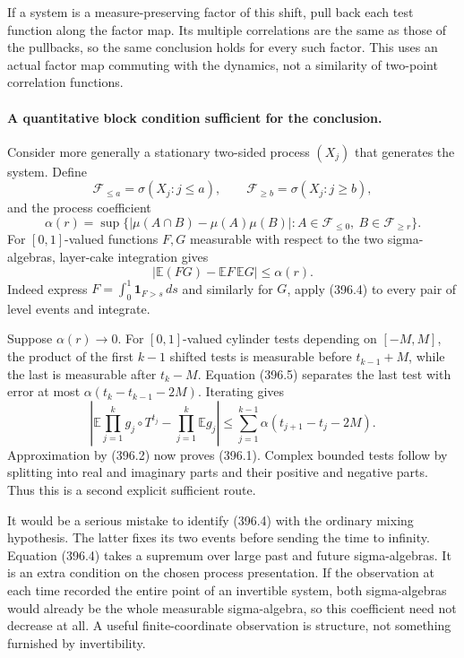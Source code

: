 \documentclass[11pt]{article}
\begin{document}
If a system is a measure-preserving factor of this shift, pull back
each test function along the factor map. Its multiple correlations
are the same as those of the pullbacks, so the same conclusion holds
for every such factor. This uses an actual factor map commuting with
the dynamics, not a similarity of two-point correlation functions.

\paragraph{A quantitative block condition sufficient for the conclusion.}
Consider more generally a stationary two-sided process $(X_j)$ that
generates the system. Define
\[
 \mathcal F_{\leq a}=\sigma(X_j:j\leq a),\qquad
 \mathcal F_{\geq b}=\sigma(X_j:j\geq b),
\]
and the process coefficient
\[
 \alpha(r)=\sup\{|\mu(A\cap B)-\mu(A)\mu(B)|:
      A\in\mathcal F_{\leq0},\ B\in\mathcal F_{\geq r}\}.
 \tag{396.4}
\]
For $[0,1]$-valued functions $F,G$ measurable with respect to the
two sigma-algebras, layer-cake integration gives
\[
 |\mathbb E(FG)-\mathbb EF\,\mathbb EG|\leq\alpha(r).
 \tag{396.5}
\]
Indeed express $F=\int_0^1\mathbf1_{F>s}\,ds$ and similarly for
$G$, apply (396.4) to every pair of level events and integrate.

Suppose $\alpha(r)\to0$. For $[0,1]$-valued cylinder tests depending
on $[-M,M]$, the product of the first $k-1$ shifted tests is measurable
before $t_{k-1}+M$, while the last is measurable after $t_k-M$.
Equation (396.5) separates the last test with error at most
$\alpha(t_k-t_{k-1}-2M)$. Iterating gives
\[
 \left|\mathbb E\prod_{j=1}^kg_j\circ T^{t_j}
       -\prod_{j=1}^k\mathbb Eg_j\right|
 \leq\sum_{j=1}^{k-1}\alpha(t_{j+1}-t_j-2M).
 \tag{396.6}
\]
Approximation by (396.2) now proves (396.1). Complex bounded tests
follow by splitting into real and imaginary parts and their positive
and negative parts. Thus this is a second explicit sufficient route.

It would be a serious mistake to identify (396.4) with the ordinary
mixing hypothesis. The latter fixes its two events before sending
the time to infinity. Equation (396.4) takes a supremum over large
past and future sigma-algebras. It is an extra condition on the chosen
process presentation. If the observation at each time recorded the
entire point of an invertible system, both sigma-algebras would already
be the whole measurable sigma-algebra, so this coefficient need not
decrease at all. A useful finite-coordinate observation is structure,
not something furnished by invertibility.
\end{document}
